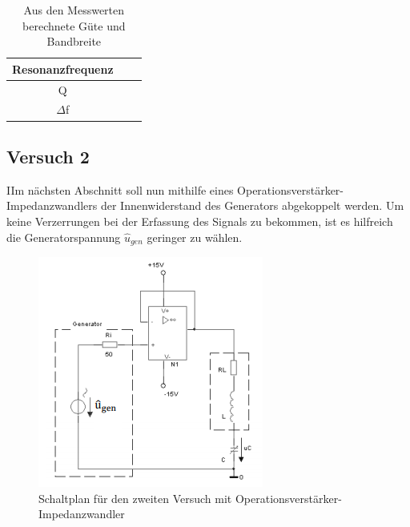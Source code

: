 \documentclass{article}
\begin{document}
\begin{table}[h]
  \begin{center}
    \begin{tabular}{|c|c|c|}
      \hline
      Resonanzfrequenz &  & \\
      \hline
      Q                &  & \\
      \hline
      $\Delta$f        &  & \\
      \hline
    \end{tabular}
    \caption{Aus den Messwerten berechnete Güte und Bandbreite}
    \label{tab:eMGB}
  \end{center}
\end{table}
\newpage
\subsection{Versuch 2}

\begin{task}
  IIm nächsten Abschnitt soll nun mithilfe eines Operationsverstärker-Impedanzwandlers
  der Innenwiderstand des Generators abgekoppelt werden. Um keine Verzerrungen bei der Erfassung
  des Signals zu bekommen, ist es hilfreich die Generatorspannung $\hat{u}_{gen}$ geringer zu wählen.
\end{task}
\begin{figure}[h]
  \begin{center}
    \includegraphics{../assets/images/ETP3/Versuch2Schaltplan.PNG}
    \caption{Schaltplan für den zweiten Versuch mit Operationsverstärker-Impedanzwandler}
  \end{center}
\end{figure}
\end{document}
